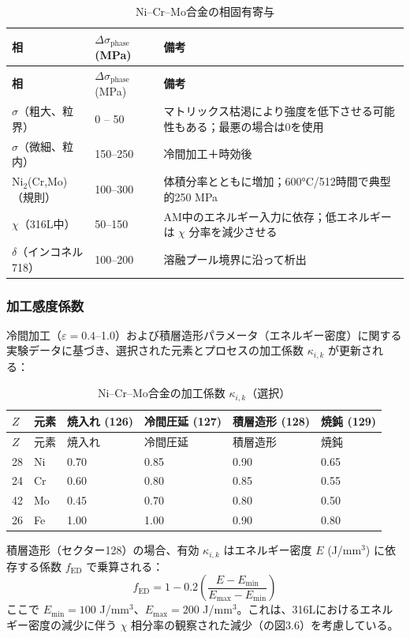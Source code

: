 \documentclass[12pt,a4paper]{article}
\begin{document}
	\begin{longtable}{p{3.5cm} p{3.0cm} p{4.0cm}}
		\caption{Ni–Cr–Mo合金の相固有寄与}\label{tab:nicrmo_phase_contrib}\\
		\toprule
		\textbf{相} & $\Delta\sigma_{\text{phase}}$ (MPa) & \textbf{備考} \\
		\midrule
		\endfirsthead
		\toprule
		\textbf{相} & $\Delta\sigma_{\text{phase}}$ (MPa) & \textbf{備考} \\
		\midrule
		\endhead
		$\sigma$（粗大、粒界） & 0 – 50 & マトリックス枯渇により強度を低下させる可能性もある；最悪の場合は0を使用 \\
		$\sigma$（微細、粒内） & 150–250 & 冷間加工＋時効後 \\
		Ni$_2$(Cr,Mo)（規則） & 100–300 & 体積分率とともに増加；600°C/512時間で典型的250 MPa \\
		$\chi$（316L中） & 50–150 & AM中のエネルギー入力に依存；低エネルギーは $\chi$ 分率を減少させる \\
		$\delta$（インコネル718） & 100–200 & 溶融プール境界に沿って析出 \\
		\bottomrule
	\end{longtable}
	
	\subsubsection{加工感度係数}
	冷間加工（$\varepsilon=0.4$–1.0）および積層造形パラメータ（エネルギー密度）に関する実験データに基づき、選択された元素とプロセスの加工係数 $\kappa_{i,k}$ が更新される：
	
	\begin{longtable}{p{1.5cm} p{1.2cm} p{1.8cm} p{1.8cm} p{1.8cm} p{1.8cm}}
		\caption{Ni–Cr–Mo合金の加工係数 $\kappa_{i,k}$（選択）}\label{tab:nicrmo_kappa_ik}\\
		\toprule
		$Z$ & 元素 & 焼入れ (126) & 冷間圧延 (127) & 積層造形 (128) & 焼鈍 (129) \\
		\midrule
		\endfirsthead
		\toprule
		$Z$ & 元素 & 焼入れ & 冷間圧延 & 積層造形 & 焼鈍 \\
		\midrule
		\endhead
		28 & Ni & 0.70 & 0.85 & 0.90 & 0.65 \\
		24 & Cr & 0.60 & 0.80 & 0.85 & 0.55 \\
		42 & Mo & 0.45 & 0.70 & 0.80 & 0.50 \\
		26 & Fe & 1.00 & 1.00 & 0.90 & 0.80 \\
		\bottomrule
	\end{longtable}
	
	積層造形（セクター128）の場合、有効 $\kappa_{i,k}$ はエネルギー密度 $E$ (J/mm$^3$) に依存する係数 $f_{\text{ED}}$ で乗算される：
	\[
	f_{\text{ED}} = 1 - 0.2\left(\frac{E - E_{\text{min}}}{E_{\text{max}} - E_{\text{min}}}\right)
	\]
	ここで $E_{\text{min}}=100$ J/mm$^3$、$E_{\text{max}}=200$ J/mm$^3$。これは、316Lにおけるエネルギー密度の減少に伴う $\chi$ 相分率の観察された減少（\cite{dis2025}の図3.6）を考慮している。
	
\end{document}
